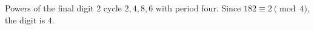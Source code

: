 Powers of the final digit $2$ cycle $2,4,8,6$ with period four. Since $182\equiv2\pmod4$, the digit is $\boxed4$.
